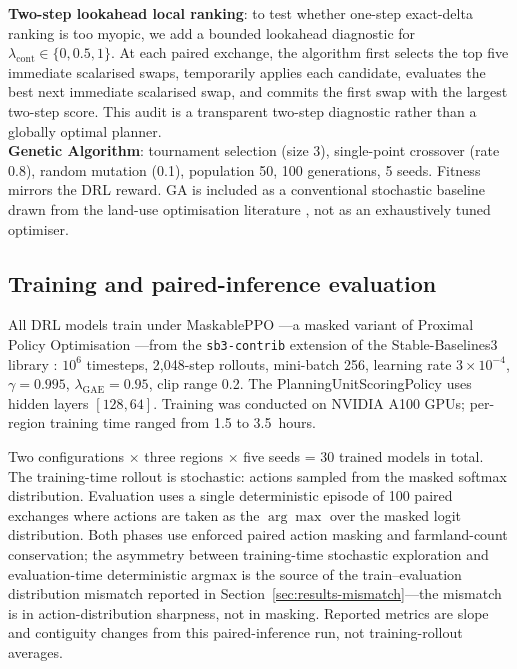 \documentclass[]{interact}
\theoremstyle{plain}
\begin{document}
\textbf{Two-step lookahead local ranking}: to test whether one-step exact-delta ranking is too myopic, we add a bounded lookahead diagnostic for $\lambda_{\mathrm{cont}}\in\{0,0.5,1\}$. At each paired exchange, the algorithm first selects the top five immediate scalarised swaps, temporarily applies each candidate, evaluates the best next immediate scalarised swap, and commits the first swap with the largest two-step score. This audit is a transparent two-step diagnostic rather than a globally optimal planner.\\
\textbf{Genetic Algorithm}: tournament selection (size 3), single-point crossover (rate 0.8), random mutation (0.1), population 50, 100 generations, 5 seeds. Fitness mirrors the DRL reward. GA is included as a conventional stochastic baseline drawn from the land-use optimisation literature \citep{cao2011sustainable,stewart2004multiobjective}, not as an exhaustively tuned optimiser.

\subsection{Training and paired-inference evaluation}

All DRL models train under MaskablePPO \citep{huang2022closer}---a masked variant of Proximal Policy Optimisation \citep{schulman2017proximal}---from the \texttt{sb3-contrib} extension of the Stable-Baselines3 library \citep{raffin2021stablebaselines}: $10^6$ timesteps, 2{,}048-step rollouts, mini-batch 256, learning rate $3{\times}10^{-4}$, $\gamma=0.995$, $\lambda_{\text{GAE}}=0.95$, clip range 0.2. The PlanningUnitScoringPolicy uses hidden layers $[128, 64]$. Training was conducted on NVIDIA A100 GPUs; per-region training time ranged from 1.5 to 3.5~hours.

Two configurations $\times$ three regions $\times$ five seeds = 30 trained models in total. The training-time rollout is stochastic: actions sampled from the masked softmax distribution. Evaluation uses a single deterministic episode of 100 paired exchanges where actions are taken as the $\arg\max$ over the masked logit distribution. Both phases use enforced paired action masking and farmland-count conservation; the asymmetry between training-time stochastic exploration and evaluation-time deterministic argmax is the source of the train--evaluation distribution mismatch reported in Section~\ref{sec:results-mismatch}---the mismatch is in action-distribution sharpness, not in masking. Reported metrics are slope and contiguity changes from this paired-inference run, not training-rollout averages.
\end{document}
